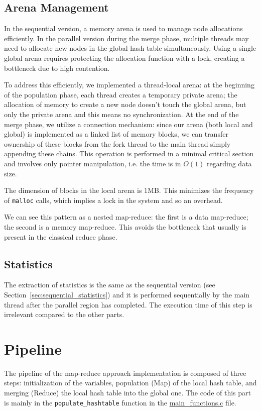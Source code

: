 \subsection{Arena Management}
In the sequential version, a memory arena is used to manage node allocations efficiently. In the parallel version during the merge phase, multiple threads may need to allocate new nodes in the global hash table simultaneously. Using a single global arena requires protecting the allocation function with a lock, creating a bottleneck due to high contention.

To address this efficiently, we implemented a thread-local arena: at the beginning of the population phase, each thread creates a temporary private arena; the allocation of memory to create a new node doesn't touch the global arena, but only the private arena and this means no synchronization.
At the end of the merge phase, we utilize a connection mechanism: since our arena (both local and global) is implemented as a linked list of memory blocks, we can transfer ownership of these blocks from the fork thread to the main thread simply appending these chains. This operation is performed in a minimal critical section and involves only pointer manipulation, i.e. the time is in $O(1)$ regarding data size.

The dimension of blocks in the local arena is 1MB. This minimizes the frequency of \texttt{malloc} calls, which implies a lock in the system and so an overhead.

We can see this pattern as a nested map-reduce: the first is a data map-reduce; the second is a memory map-reduce. This avoids the bottleneck that usually is present in the classical reduce phase.

\subsection{Statistics}
The extraction of statistics is the same as the sequential version (see Section~\ref{sec:sequential_statistics}) and it is performed sequentially by the main thread after the parallel region has completed. The execution time of this step is irrelevant compared to the other parts.

\section{Pipeline}
\label{sec:par_pipeline}
The pipeline of the map-reduce approach implementation is composed of three steps: initialization of the variables, population (Map) of the local hash table, and merging (Reduce) the local hash table into the global one. The code of this part is mainly in the \texttt{populate\_hashtable} function in the \href{https://github.com/edoardosarri24/parallel-trigrams/blob/ef94c1127b974ed4241ad355c5d9b218b3484e1f/parallel/src/main_functions.c}{main\_functions.c} file.

